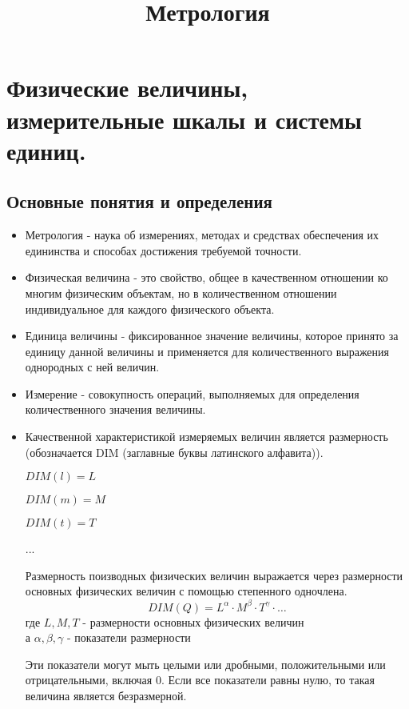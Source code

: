 \documentclass[a4paper, 12pt]{article}
\title{Метрология}
\begin{document}
\maketitle
\newpage

\section{Физические величины, измерительные шкалы и системы единиц.}
\subsection{Основные понятия и определения}
\begin{itemize}
	\item Метрология - наука об измерениях, методах и средствах обеспечения их
	      едининства и способах достижения требуемой точности.
	\item Физическая величина - это свойство, общее в качественном отношении ко
	      многим физическим объектам, но в количественном отношении
	      индивидуальное для каждого физического объекта.
	\item Единица величины - фиксированное значение величины, которое принято
	      за единицу данной величины и применяется для количественного выражения
	      однородных с ней величин.
	\item Измерение - совокупность операций, выполняемых для определения
	      количественного значения величины.
	\item Качественной характеристикой измеряемых величин является размерность
	      (обозначается DIM (заглавные буквы латинского алфавита)).
	      \begin{center}
		      \( DIM(l)= L \)

		      \( DIM(m)= M \)

		      \( DIM(t)= T \)

		      ...
	      \end{center}
	      Размерность поизводных физических величин выражается через размерности
	      основных физических величин с помощью степенного одночлена.
	      \[
		      DIM(Q) = L^{\alpha} \cdot M^{\beta} \cdot T^{\gamma} \cdot \ldots
	      \]
	      где \( L, M, T \) - размерности основных физических величин\\
	      а \( \alpha, \beta, \gamma \) - показатели размерности

	      Эти показатели могут мыть целыми или дробными, положительными или
	      отрицательными, включая 0. Если все показатели равны нулю, то такая
	      величина является безразмерной.


\end{itemize}
\end{document}
